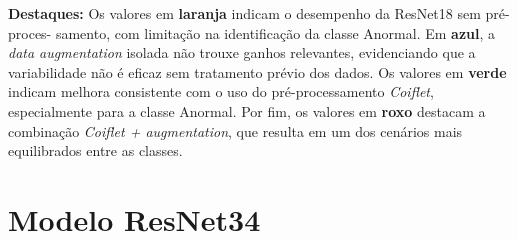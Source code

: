 \begin{table}[!h]
\centering
\caption{Resultados da ResNet18 sob diferentes configurações}
\label{tab:resnet18}
\renewcommand{\arraystretch}{1.2}
\fonteproprioautor
\end{table}


\begin{flushleft}
\footnotesize
\textbf{Destaques:} Os valores em \textbf{laranja} indicam o desempenho da ResNet18
sem pré-proces- \newline samento, com limitação na identificação da classe Anormal.
Em \textbf{azul}, a \textit{data augmentation} isolada não trouxe ganhos relevantes,
evidenciando que a variabilidade não é eficaz sem tratamento prévio dos dados.
Os valores em \textbf{verde} indicam melhora consistente com o uso do
pré-processamento \textit{Coiflet}, especialmente para a classe Anormal.
Por fim, os valores em \textbf{roxo} destacam a combinação \textit{Coiflet + augmentation},
que resulta em um dos cenários mais equilibrados entre as classes.
\end{flushleft}

\section*{Modelo ResNet34}

